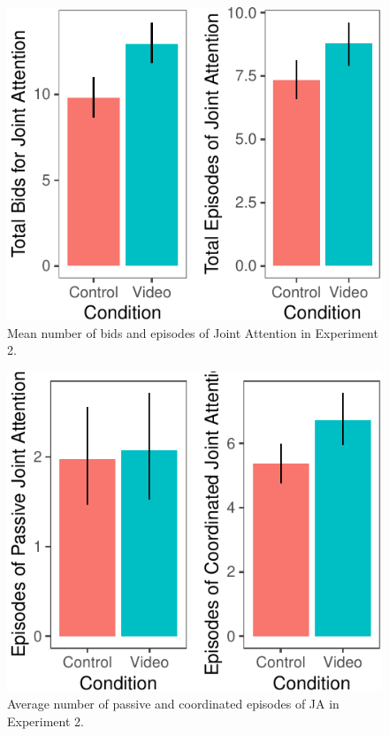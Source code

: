 \documentclass[10pt, letterpaper]{article}
\newenvironment{CodeChunk}{}{}
\begin{document}
\begin{CodeChunk}
\begin{figure}[H]

{\centering \includegraphics{figs/e2ja-graphs-1} 

}

\caption[Mean number of bids and episodes of Joint Attention in Experiment 2]{Mean number of bids and episodes of Joint Attention in Experiment 2.}\label{fig:e2ja-graphs}
\end{figure}
\end{CodeChunk}

\begin{CodeChunk}
\begin{figure}[H]

{\centering \includegraphics{figs/e2ja-graphs-pass-coord-1} 

}

\caption[Average number of passive and coordinated episodes of JA in Experiment 2]{Average number of passive and coordinated episodes of JA in Experiment 2.}\label{fig:e2ja-graphs-pass-coord}
\end{figure}
\end{CodeChunk}
\end{document}
